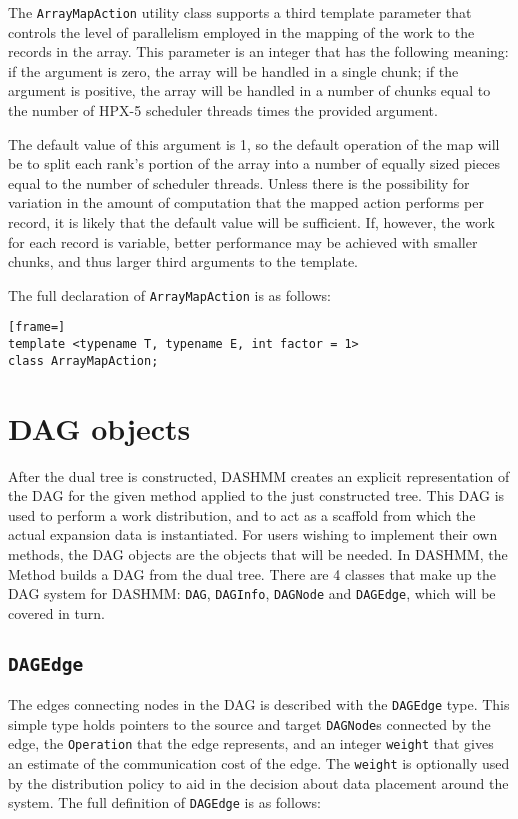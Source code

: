 The \texttt{ArrayMapAction} utility class supports a third template parameter
that controls the level of parallelism employed in the mapping of the work
to the records in the array. This parameter is an integer that has the
following meaning: if the argument is zero, the array will be handled in a
single chunk; if the argument is positive, the array will be handled in a number
of chunks equal to the number of HPX-5 scheduler threads times the provided
argument.

The default value of this argument is 1, so the default operation of
the map will be to split each rank's portion of the array into a number of
equally sized pieces equal to the number of scheduler threads. Unless there is
the possibility for variation in the amount of computation that the mapped
action performs per record, it is likely that the default value will be
sufficient. If, however, the work for each record is variable, better
performance may be achieved with smaller chunks, and thus larger third arguments
to the template.

The full declaration of \texttt{ArrayMapAction} is as follows:

\begin{lstlisting}[frame=]
template <typename T, typename E, int factor = 1>
class ArrayMapAction;
\end{lstlisting}



\section{DAG objects}

After the dual tree is constructed, DASHMM creates an explicit representation
of the DAG for the given method applied to the just constructed tree. This DAG
is used to perform a work distribution, and to act as a scaffold from which
the actual expansion data is instantiated. For users wishing to implement
their own methods, the DAG objects are the objects that will be needed. In
DASHMM, the Method builds a DAG from the dual tree. There are 4 classes that
make up the DAG system for DASHMM: \texttt{DAG}, \texttt{DAGInfo},
\texttt{DAGNode} and \texttt{DAGEdge}, which will be covered in turn.

\subsection{\texttt{DAGEdge}}

The edges connecting nodes in the DAG is described with the \texttt{DAGEdge}
type. This simple type holds pointers to the source and target
\texttt{DAGNode}s connected by the edge, the \texttt{Operation} that the edge
represents, and an integer \texttt{weight} that gives an estimate of the
communication cost of the edge. The \texttt{weight} is optionally used by the
distribution policy to aid in the decision about data placement around the
system. The full definition of \texttt{DAGEdge} is as follows:


